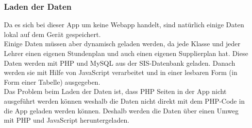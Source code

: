 \subsubsection{Laden der Daten}
Da es sich bei dieser App um keine Webapp handelt, sind natürlich einige Daten lokal auf dem Gerät gespeichert.\\ Einige Daten müssen aber dynamisch geladen werden, da jede Klasse und jeder Lehrer einen eigenen Stundenplan und auch einen eigenen Supplierplan hat. Diese Daten werden mit PHP und MySQL aus der SIS-Datenbank geladen. Danach werden sie mit Hilfe von JavaScript verarbeitet und in einer lesbaren Form (in Form einer Tabelle) ausgegeben.\\
Das Problem beim Laden der Daten ist, dass PHP Seiten in der App nicht ausgeführt werden können weshalb die Daten nicht direkt mit dem PHP-Code in die App geladen werden können. Deshalb werden die Daten über einen Umweg mit PHP und JavaScript heruntergeladen.\\
